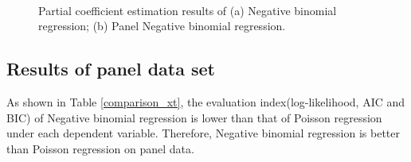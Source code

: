 \documentclass[num-refs]{wiley-article}
\begin{document}
\begin{figure}[htbp]
	\centering
	\\ 
	\caption{Partial coefficient estimation results of (a) Negative binomial regression; (b) Panel Negative binomial regression.}
	\label{coef}
\end{figure}
\subsection{Results of panel data set}
As shown in Table \ref{comparison_xt}, the evaluation index(log-likelihood, AIC and BIC) of Negative binomial regression is lower than that of Poisson regression under each dependent variable. Therefore, Negative binomial regression is better than Poisson regression on panel data. 
\end{document}
